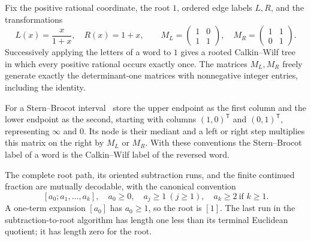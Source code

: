 \begin{theorem}
\label{final:B1}
Fix the positive rational coordinate, the root $1$, ordered edge
labels $L,R$, and the transformations
\[
 L(x)=\frac{x}{1+x},\quad R(x)=1+x,\qquad
 M_L=\begin{pmatrix}1&0\\1&1\end{pmatrix},\quad
 M_R=\begin{pmatrix}1&1\\0&1\end{pmatrix}.
\]
Successively applying the letters of a word to $1$ gives a rooted
Calkin--Wilf tree~\cite{CalkinWilf} in which every positive rational occurs exactly
once.  The matrices $M_L,M_R$ freely generate exactly the determinant-one
matrices with nonnegative integer entries, including the identity.

For a Stern--Brocot interval~\cite{Stern1858} store the upper endpoint as the first
column and the lower endpoint as the second, starting with columns
$(1,0)^{\mathsf T}$ and $(0,1)^{\mathsf T}$, representing $\infty$ and
$0$.  Its node is their mediant and a left or right step multiplies
this matrix on the right by $M_L$ or $M_R$.  With these conventions
the Stern--Brocot label of a word is the Calkin--Wilf label of the
reversed word.

The complete root path, its oriented subtraction runs, and the
finite continued fraction are mutually decodable, with the canonical
convention
\[
 [a_0;a_1,\ldots,a_k],\quad a_0\geq0,\quad
 a_j\geq1\ (j\geq1),\quad a_k\geq2\ \text{if }k\geq1.
\]
A one-term expansion $[a_0]$ has $a_0\geq1$, so the root is $[1]$.
The last run in the subtraction-to-root algorithm has length one less
than its terminal Euclidean quotient; it has length zero for the root.
\end{theorem}

